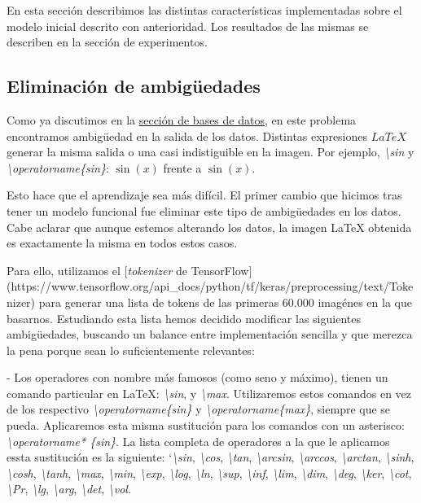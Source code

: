 \documentclass[a4paper, 20pt, dvipsnames]{article}
\begin{document}
En esta sección describimos las distintas características implementadas sobre el modelo inicial descrito con anterioridad. Los resultados de las mismas se describen en la sección de experimentos.


\subsection{Eliminación de ambigüedades}

Como ya discutimos en la \hyperref[sec:datasets]{sección de bases de datos}, en este problema encontramos ambigüedad en la salida de los datos. Distintas expresiones $LaTeX$ generar la misma salida o una casi indistiguible en la imagen. Por ejemplo, \emph{\textbackslash sin} y \emph{\textbackslash operatorname\{sin\}}: $\sin(x)$ frente a $\operatorname{sin}(x)$.

Esto hace que el aprendizaje sea  más difícil. El primer cambio que hicimos tras tener un modelo funcional fue eliminar este tipo de ambigüedades en los datos. Cabe aclarar que aunque estemos alterando los datos, la imagen \LaTeX{} obtenida es exactamente la misma en todos estos casos.

Para ello, utilizamos el [\emph{tokenizer} de TensorFlow](https://www.tensorflow.org/api\_docs/python/tf/keras/preprocessing/text/Tokenizer) para generar una lista de tokens de las primeras 60.000 imagénes en la que basarnos. Estudiando esta lista hemos decidido modificar las siguientes ambigüedades, buscando un balance entre implementación sencilla y que merezca la pena porque sean lo suficientemente relevantes:

- Los operadores con nombre más famosos (como seno y máximo), tienen un comando particular en \LaTeX{}: \emph{\textbackslash sin}, y \emph{\textbackslash max}. Utilizaremos estos comandos en vez de los respectivo \emph{\textbackslash operatorname\{sin\}} y \emph{\textbackslash operatorname\{max\}}, siempre que se pueda. Aplicaremos esta misma sustitución para los comandos con un asterisco: \emph{\textbackslash operatorname* \{sin\}}. La lista completa de operadores a  la que le aplicamos essta sustitución es la siguiente: `\emph{\textbackslash sin}, \emph{\textbackslash cos}, \emph{\textbackslash tan}, \emph{\textbackslash arcsin}, \emph{\textbackslash arccos}, \emph{\textbackslash arctan}, \emph{\textbackslash sinh}, \emph{\textbackslash cosh}, \emph{\textbackslash tanh}, \emph{\textbackslash max}, \emph{\textbackslash min}, \emph{\textbackslash exp}, \emph{\textbackslash log}, \emph{\textbackslash ln}, \emph{\textbackslash sup}, \emph{\textbackslash inf}, \emph{\textbackslash lim}, \emph{\textbackslash dim}, \emph{\textbackslash deg}, \emph{\textbackslash ker}, \emph{\textbackslash cot}, \emph{\textbackslash Pr}, \emph{\textbackslash lg}, \emph{\textbackslash arg}, \emph{\textbackslash det}, \emph{\textbackslash vol}.
\end{document}

